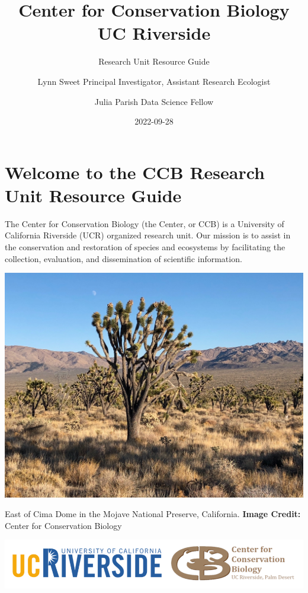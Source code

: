 \documentclass[
]{book}
\title{Center for Conservation Biology \textbar{} UC Riverside}
\subtitle{Research Unit Resource Guide}
\author{Lynn Sweet \textbar{} Principal Investigator, Assistant Research Ecologist \and Julia Parish \textbar{} Data Science Fellow}
\date{2022-09-28}
\begin{document}
\maketitle

{
\setcounter{tocdepth}{1}
\tableofcontents
}
\hypertarget{welcome-to-the-ccb-research-unit-resource-guide}{%
\chapter*{Welcome to the CCB Research Unit Resource Guide}\label{welcome-to-the-ccb-research-unit-resource-guide}}

The Center for Conservation Biology (the Center, or CCB) is a University of California Riverside (UCR) organized research unit. Our mission is to assist in the conservation and restoration of species and ecosystems by facilitating the collection, evaluation, and dissemination of scientific information.

\includegraphics[width=1\linewidth]{images/cima2019}

East of Cima Dome in the Mojave National Preserve, California.
\textbf{Image Credit:} Center for Conservation Biology

\begin{center}\includegraphics[width=0.75\linewidth]{images/ucrccb} \end{center}
\end{document}
